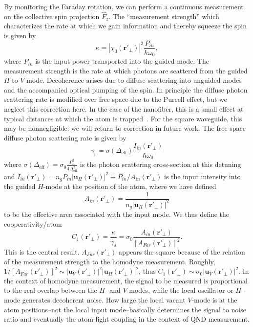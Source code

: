 \documentclass[preprint,aps,pra,onecolumn,superscriptaddress]{revtex4-1} %
\newcommand{\mbf}[1]{\mathbf{#1}}
\newcommand{\eff}{\text{eff}}
\begin{document}
By monitoring the Faraday rotation, we can perform a continuous measurement on the collective spin projection $\hat{F}_z$.  The ``measurement strength'' which characterizes the rate at which we gain information and thereby squeeze the spin is given by
\begin{equation}
\kappa = \left\vert \chi_3(\mbf{r}'_\perp) \right\vert^2 \frac{P_{in}}{\hbar \omega_0},
\end{equation}
where $P_{in}$ is the input power transported into the guided mode.  The measurement strength is the rate at which photons are scattered from the guided $H$ to $V$ mode.  Decoherence arises due to diffuse scattering into unguided modes and the accompanied optical pumping of the spin.  In principle the diffuse photon scattering rate is modified over free space due to the Purcell effect, but we neglect this correction here.  In the case of the nanofiber, this is a small effect at typical distances at which the atom is trapped~\cite{?}.  For the square waveguide, this may be nonnegligible; we will return to correction in future work.  The free-space diffuse photon scattering rate is given by
\begin{equation}
\gamma_s = \sigma(\Delta_{\eff}) \frac{I_{in}(\mbf{r}'_\perp)}{\hbar \omega_0}
\end{equation}
where $\sigma(\Delta_{\eff}) = \sigma_0 \frac{\Gamma_A^2}{4 \Delta^2_{\eff}}$ is the photon scattering cross-section at this detuning and  $I_{in}(\mbf{r}'_\perp) = n_g P_{in}\vert \mbf{u}_H (\mbf{r}'_\perp)  \vert^2 \equiv P_{in}/A_{in}(\mbf{r}'_\perp) $ is the input intensity into the guided $H$-mode at the position of the atom, where we have defined
\begin{equation}
A_{in}(\mbf{r}'_\perp) =  \frac{1}{n_g \vert \mbf{u}_H (\mbf{r}'_\perp) \vert ^2}
\end{equation}
to be the effective area associated with the input mode.  We thus define the cooperativity/atom
\begin{equation}
C_1 (\mbf{r}'_\perp)  = \frac{\kappa}{\gamma_s} = \sigma_0 \frac{  A_{in}(\mbf{r}'_\perp) }{[A_{Far}(\mbf{r}'_\perp)]^2}.
\end{equation}
This is the central result.  $A_{Far}(\mbf{r}'_\perp)$  appears the square because of the relation of the measurement strength to the homodyne measurement.  Roughly, $1/[A_{Far}(\mbf{r}'_\perp)]^2 \sim \vert \mbf{u}_V (\mbf{r}'_\perp) \vert ^2 \vert \mbf{u}_H (\mbf{r}'_\perp) \vert ^2$, thus $ C_1(\mbf{r}'_\perp) \sim \sigma_0 \vert \mbf{u}_V (\mbf{r}'_\perp) \vert ^2$. In the context of homodyne measurement, the signal to be measured is proportional to the real overlap between the $ H $- and $ V $-modes, while the local oscillator or $ H $-mode generates decoherent noise. How large the local vacant $ V $-mode is at the atom positions--not the local input mode--basically determines the signal to noise ratio and eventually the atom-light coupling in the context of QND measurement. 
\end{document}
